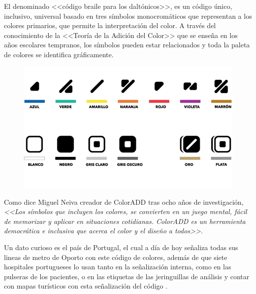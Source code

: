 \documentclass[10pt]{article}
\begin{document}
El denominado <<código braile para los daltónicos>>, es un código único, inclusivo, universal basado en tres símbolos monocromáticos que representan a los colores primarios, que permite la interpretación del color. A través del conocimiento de la <<Teoría de la Adición del Color>> que se enseña en los años escolares tempranos, los símbolos pueden estar relacionados y toda la paleta de colores se identifica gráficamente\cite{IEEEreferencias:Ref17}.
\newline
\begin{figure}[H]
	\begin{center}
\includegraphics[scale = 0.65]{Imagenes/coloradd.PNG}
	\end{center} 
\end{figure}

Como dice Miguel Neiva creador de ColorADD tras ocho años de investigación, \textit{<<Los símbolos que incluyen los colores, se convierten en un juego mental, fácil de memorizar y aplicar en situaciones cotidianas. ColorADD es un herramienta democrática e inclusiva que acerca el color y el diseño a todos>>}\cite{IEEEreferencias:Ref17}. \newline

Un dato curioso es el país de Portugal, el cual a día de hoy señaliza todas sus lineas de metro de Oporto con este código de colores, además de que siete hospitales portugueses lo usan tanto en la señalización interna, como en las pulseras de los pacientes, o en las etiquetas de las jeringuillas de análisis y contar con mapas turísticos con esta señalización del código \cite{IEEEreferencias:Ref17}.
\end{document}
